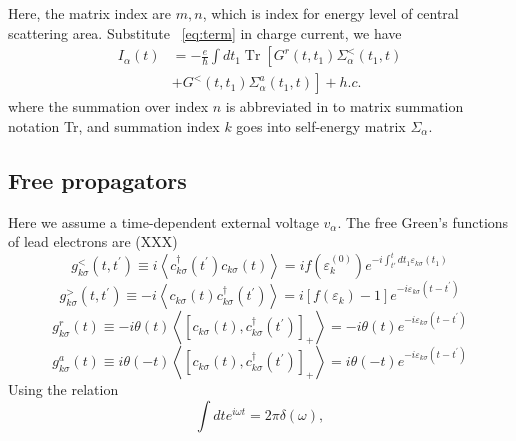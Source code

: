\documentclass[11pt,a4paper]{article}
\begin{document}
Here, the matrix index are $m, n$, which is index for energy level of central scattering area. Substitute ~\ref{eq:term} in charge current, we have
\begin{equation}
\begin{aligned}
I_{\alpha}(t) &=-\frac{e}{\hbar} \int d t_{1} \operatorname{Tr}\left[G^{r}\left(t, t_{1}\right) \Sigma_{\alpha}^{<}\left(t_{1}, t\right)\right.\\
&\left.+G^{<}\left(t, t_{1}\right) \Sigma_{\alpha}^{a}\left(t_{1}, t\right)\right]+h . c .
\end{aligned}
\end{equation}
where the summation over index $n$ is abbreviated in to matrix summation notation Tr, and summation index $k$ goes into self-energy matrix $\Sigma_{\alpha}$.
\subsection{Free propagators}
Here we assume a time-dependent external voltage $v_{\alpha}$. The free Green's functions of lead electrons are (XXX)
\begin{equation}
g_{k \sigma}^{<}\left(t, t^{\prime}\right) \equiv i\left\langle c_{k \sigma}^{\dagger}\left(t^{\prime}\right) c_{k \sigma}(t)\right\rangle=i f(\varepsilon_{k}^{(0)}) e^{-i \int_{t'}^{t}dt_{1}\varepsilon_{k\sigma}(t_{1})}
\end{equation}
\begin{equation}
g_{k \sigma}^{>}\left(t, t^{\prime}\right) \equiv-i\left\langle c_{k \sigma}(t) c_{k \sigma}^{\dagger}\left(t^{\prime}\right)\right\rangle=i\left[f\left(\varepsilon_{k}\right)-1\right] e^{-i \varepsilon_{k\sigma}\left(t-t^{\prime}\right)}
\end{equation}
\begin{equation}
g_{k \sigma}^{r}(t) \equiv-i \theta(t)\left\langle\left[c_{k \sigma}(t), c_{k \sigma}^{\dagger}\left(t^{\prime}\right)\right]_{+}\right\rangle=-i \theta(t) e^{-i \varepsilon_{k\sigma}\left(t-t^{\prime}\right)}
\end{equation}
\begin{equation}
g_{k \sigma}^{a}(t) \equiv i \theta(-t)\left\langle\left[c_{k \sigma}(t), c_{k \sigma}^{\dagger}\left(t^{\prime}\right)\right]_{+}\right\rangle=i \theta(-t) e^{-i \varepsilon_{k\sigma}\left(t-t^{\prime}\right)}
\end{equation}
Using the relation
\begin{equation}
\int d t e^{i \omega t}=2 \pi \delta(\omega),
\end{equation}
\end{document}
